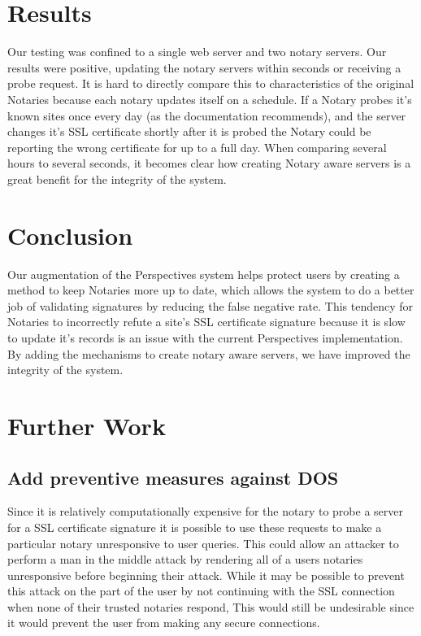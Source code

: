 \documentclass[preprint,review,12pt]{elsarticle}
\begin{document}
\section{Results}
\label{results}

Our testing was confined to a single web server and two notary servers. Our
results were positive, updating the notary servers within seconds or receiving
a probe request. It is hard to directly compare this to characteristics of the
original Notaries because each notary updates itself on a schedule. If a Notary
probes it's known sites once every day (as the documentation recommends), and
the server changes it's SSL certificate shortly after it is probed the Notary
could be reporting the wrong certificate for up to a full day. When comparing
several hours to several seconds, it becomes clear how creating Notary aware
servers is a great benefit for the integrity of the system.

\section{Conclusion}
\label{conclusion}

Our augmentation of the Perspectives system helps protect users by creating a
method to keep Notaries more up to date, which allows the system to do a better
job of validating signatures by reducing the false negative rate. This tendency
for Notaries to incorrectly refute a site's SSL certificate signature because
it is slow to update it's records is an issue with the current Perspectives
implementation. By adding the mechanisms to create notary aware servers, we
have improved the integrity of the system.

\section{Further Work}
\label{further work}

\subsection{Add preventive measures against DOS}

Since it is relatively computationally expensive for the notary to probe a
server for a SSL certificate signature it is possible to use these requests to
make a particular notary unresponsive to user queries. This could allow an
attacker to perform a man in the middle attack by rendering all of a users
notaries unresponsive before beginning their attack. While it may be possible
to prevent this attack on the part of the user by not continuing with the SSL
connection when none of their trusted notaries respond, This would still be
undesirable since it would prevent the user from making any secure connections.
\end{document}

